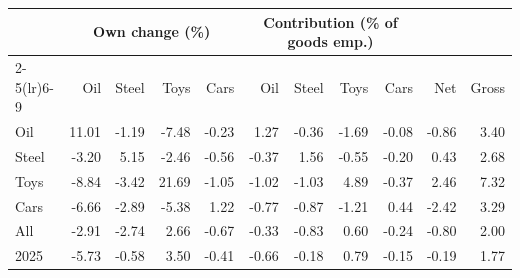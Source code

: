 \begin{tabular}{lrrrrrrrrrr}
\toprule
 & \multicolumn{4}{c}{Own change (\%)} & \multicolumn{4}{c}{Contribution (\% of goods emp.)} & & \\
\cmidrule(lr){2-5}\cmidrule(lr){6-9}
 & Oil & Steel & Toys & Cars & Oil & Steel & Toys & Cars & Net & Gross \\
\midrule
Oil & 11.01 & -1.19 & -7.48 & -0.23 & 1.27 & -0.36 & -1.69 & -0.08 & -0.86 & 3.40 \\
Steel & -3.20 & 5.15 & -2.46 & -0.56 & -0.37 & 1.56 & -0.55 & -0.20 & 0.43 & 2.68 \\
Toys & -8.84 & -3.42 & 21.69 & -1.05 & -1.02 & -1.03 & 4.89 & -0.37 & 2.46 & 7.32 \\
Cars & -6.66 & -2.89 & -5.38 & 1.22 & -0.77 & -0.87 & -1.21 & 0.44 & -2.42 & 3.29 \\
All & -2.91 & -2.74 & 2.66 & -0.67 & -0.33 & -0.83 & 0.60 & -0.24 & -0.80 & 2.00 \\
2025 & -5.73 & -0.58 & 3.50 & -0.41 & -0.66 & -0.18 & 0.79 & -0.15 & -0.19 & 1.77 \\
\bottomrule
\end{tabular}
